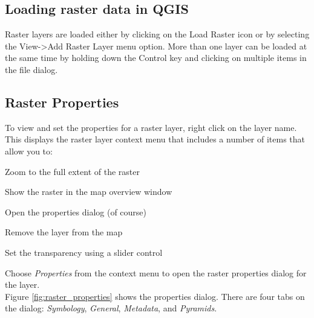 \subsection{Loading raster data in QGIS}
Raster layers are
loaded either by clicking on the Load Raster icon or by selecting the View->Add
Raster Layer menu option. More than one layer can be loaded at the same time by
holding down the Control key and clicking on multiple items in the file
dialog.\\
	
\subsection{Raster Properties}

To
view and set the properties for a raster layer, right click on the layer name.
This displays the raster layer context menu that includes a number of items that
allow you to:
\begin{compactitem}
\item Zoom to the full extent of the raster
\item Show the raster in the map overview window
\item Open the properties dialog (of course)
\item Remove the layer from the map
\item Set the transparency using a slider control
\end{compactitem}
Choose \textsl{Properties} from the context menu to open the raster properties
dialog for the layer.\\


Figure \ref{fig:raster_properties} shows the properties dialog. There are four tabs on the dialog: \textsl{Symbology}, \textsl{General}, \textsl{Metadata}, and \textsl{Pyramids}.

